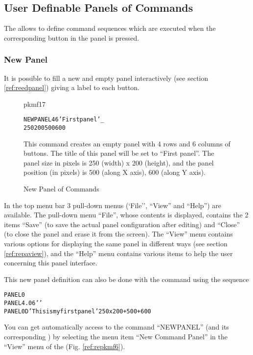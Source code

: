 \subsection{User Definable Panels of Commands}
\label{ref:repanel}

The \PNI{} allows to define
command sequences which are executed when the corresponding button
in the panel is pressed.
 
\subsubsection{New Panel}

It is possible to fill a new and empty panel interactively (see
section \ref{ref:reedpanel}) giving a label to each button.
 
\begin{figure}
\begin{PICTf}[.45]{pkmf17}
\hfill
\begin{alltt}
NEWPANEL 4 6 'First panel' _
         250 200 500 600
\end{alltt}
This command creates an empty panel with 4 rows and 6 columns of buttons. The 
title of this panel will be set to ``First panel''. The panel size in pixels is 
250 (width) x 200 (height), and the panel position (in pixels) is 500 (along X 
axis), 600 (along Y axis).
\end{PICTf}
\caption{New Panel of Commands}
\label{ref:FIGPKMF17}
\end{figure}
 
In the top menu bar 3 pull-down menus (`File'', ``View'' and ``Help'')
are available. The pull-down menu ``File'', whose contents is displayed,
contains the 2 items ``Save'' (to save the actual panel configuration
after editing)
and ``Close'' (to close the panel and erase it from the screen).
The ``View'' menu contains various options for displaying the same panel
in different ways (see section \ref{ref:repaview}), and the ``Help''
menu contains various items to help the user concerning this panel interface.
 
This new panel definition can also be done with the command
 using the sequence
\begin{alltt}
   PANEL 0
   PANEL 4.06 ' '
   PANEL 0 D 'This is my first panel' 250x200+500+600
\end{alltt}
 
You can get automatically access to the command ``NEWPANEL''
(and its corresponding \CAP{}) by selecting the menu item
``New Command Panel'' in the ``View'' menu of the \EW{}
(Fig. \ref{ref:repkmf6}).
 
